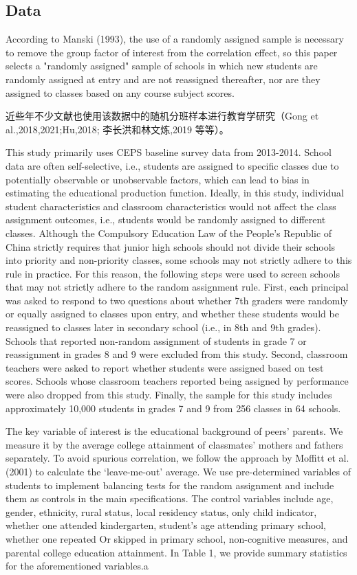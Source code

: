 \subsection{Data}

According to Manski (1993), the use of a randomly assigned sample is necessary to remove the group factor of interest from the correlation effect, so this paper selects a "randomly assigned" sample of schools in which new students are randomly assigned at entry and are not reassigned thereafter, nor are they assigned to classes based on any course subject scores.

近些年不少文献也使用该数据中的随机分班样本进行教育学研究（Gong et al.,2018,2021;Hu,2018; 李长洪和林文炼,2019 等等）。

This study primarily uses CEPS baseline survey data from 2013-2014. School data are often self-selective, i.e., students are assigned to specific classes due to potentially observable or unobservable factors, which can lead to bias in estimating the educational production function. Ideally, in this study, individual student characteristics and classroom characteristics would not affect the class assignment outcomes, i.e., students would be randomly assigned to different classes. Although the Compulsory Education Law of the People's Republic of China strictly requires that junior high schools should not divide their schools into priority and non-priority classes, some schools may not strictly adhere to this rule in practice. {For this reason, the following steps were used to screen schools that may not strictly adhere to the random assignment rule.} First, each principal was asked to respond to two questions about whether 7th graders were randomly or equally assigned to classes upon entry, and whether these students would be reassigned to classes later in secondary school (i.e., in 8th and 9th grades). Schools that reported non-random assignment of students in grade 7 or reassignment in grades 8 and 9 were excluded from this study. Second, classroom teachers were asked to report whether students were assigned based on test scores. Schools whose classroom teachers reported being assigned by performance were also dropped from this study. Finally, the sample for this study includes approximately 10,000 students in grades 7 and 9 from 256 classes in 64 schools.

The key variable of interest is the educational background of peers' parents. We measure it by the average college attainment of classmates’ mothers and fathers separately. To avoid spurious correlation, we follow the approach by Moffitt et al. (2001) to calculate the ‘leave-me-out' average. We use pre-determined variables of students to implement balancing tests for the random assignment and include them as controls in the main specifications. The control variables include age, gender, ethnicity, rural status, local residency status, only child indicator, whether one attended kindergarten, student's age attending primary school, whether one repeated Or skipped in primary school, non-cognitive measures, and parental college education attainment. In Table 1, we provide summary statistics for the aforementioned variables.a

